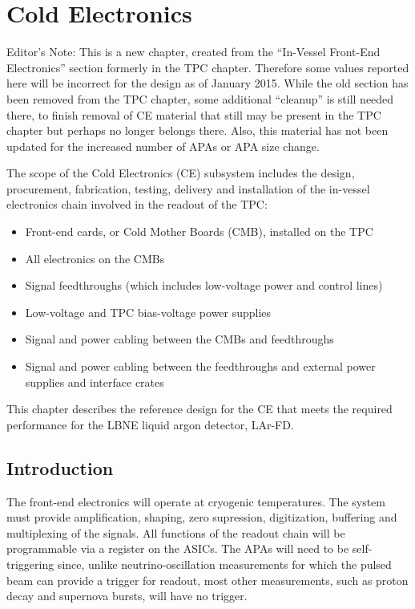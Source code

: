 \chapter{Cold Electronics}
\label{ch:ce}

\begin{editornote}
  Editor's Note:  This is a new chapter, created from the ``In-Vessel Front-End Electronics'' section formerly in the TPC chapter.
Therefore some values reported here will be incorrect for the design as of January 2015. 
While the old section has been removed from the TPC chapter, some additional ``cleanup'' is still needed there,
to finish removal of CE material that still may be present in the TPC chapter but perhaps no longer belongs there.
Also, this material has not been updated for the increased number of APAs or APA size change.
\end{editornote}

The scope of the Cold Electronics (CE) subsystem includes the design, procurement, fabrication, testing,
delivery and installation of the in-vessel electronics chain involved in the readout of the TPC:
\begin{itemize}
\item Front-end cards, or Cold Mother Boards (CMB), installed on the TPC
\item All electronics on the CMBs
\item Signal feedthroughs (which includes low-voltage power and control lines)
\item Low-voltage and TPC bias-voltage power supplies
\item Signal and power cabling between the CMBs and feedthroughs
\item Signal and power cabling between the feedthroughs and external power supplies and interface crates
\end{itemize}
This chapter describes the reference design for the CE that meets the required performance for the LBNE liquid argon detector,
LAr-FD.

\section{Introduction}
\label{sec:ce-intro}

The front-end electronics will operate at cryogenic temperatures. The system must provide 
amplification, shaping, zero supression, digitization, buffering and multiplexing of the signals.  All functions of the readout chain will be programmable via a register on the ASICs. The APAs will need to be
self-triggering since, unlike neutrino-oscillation measurements for which the pulsed beam 
can provide a trigger for readout, most other measurements, such as proton decay
and supernova bursts, will have no trigger.  


